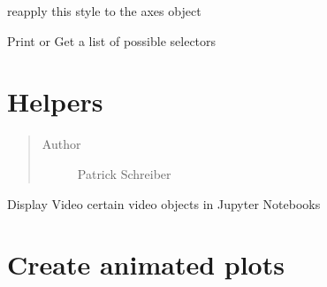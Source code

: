 \documentclass[letterpaper,10pt,openany,oneside,english]{sphinxmanual}
\begin{document}
\begin{fulllineitems}
\begin{fulllineitems}
\end{fulllineitems}


\begin{fulllineitems}
\label{\detokenize{config:config.Style.reapply}}
reapply this style to the axes object

\end{fulllineitems}


\begin{fulllineitems}
\label{\detokenize{config:config.Style.selectors}}
Print or Get a list of possible selectors

\end{fulllineitems}


\end{fulllineitems}

\label{\detokenize{helpers:module-helpers}}

\chapter{Helpers}
\label{\detokenize{helpers:id1}}\label{\detokenize{helpers::doc}}\label{\detokenize{helpers:helpers}}\begin{quote}\begin{description}
\item[{Author}] \leavevmode
Patrick Schreiber

\end{description}\end{quote}

\begin{fulllineitems}
\label{\detokenize{helpers:helpers.display_video}}
Display Video certain video objects in Jupyter Notebooks

\end{fulllineitems}

\label{\detokenize{animation:module-animation}}

\chapter{Create animated plots}
\label{\detokenize{animation::doc}}\label{\detokenize{animation:create-animated-plots}}\label{\detokenize{animation:animation}}
\end{document}
